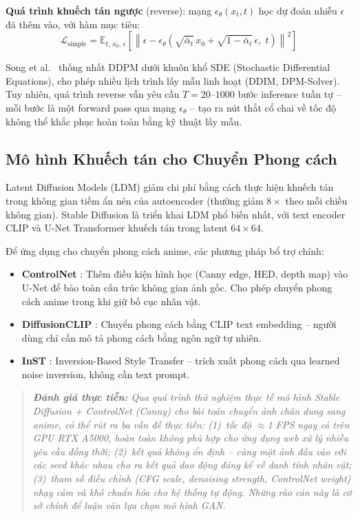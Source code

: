 \textbf{Quá trình khuếch tán ngược} (reverse): mạng $\epsilon_\theta(x_t, t)$ học dự đoán nhiễu $\epsilon$ đã thêm vào, với hàm mục tiêu:
\begin{equation}
\label{eq:diffusion_loss}
\mathcal{L}_{\text{simple}} = \mathbb{E}_{t,\, x_0,\, \epsilon}\!\left[\left\| \epsilon - \epsilon_\theta\!\left(\sqrt{\bar{\alpha}_t}\,x_0 + \sqrt{1-\bar{\alpha}_t}\,\epsilon,\; t\right) \right\|^2\right]
\end{equation}

Song et al.~\cite{Song2021} thống nhất DDPM dưới khuôn khổ SDE (Stochastic Differential Equations), cho phép nhiều lịch trình lấy mẫu linh hoạt (DDIM, DPM-Solver). Tuy nhiên, quá trình reverse vẫn yêu cầu $T = 20$--$1000$ bước inference tuần tự -- mỗi bước là một forward pass qua mạng $\epsilon_\theta$ -- tạo ra nút thắt cổ chai về tốc độ không thể khắc phục hoàn toàn bằng kỹ thuật lấy mẫu.

\subsection{Mô hình Khuếch tán cho Chuyển Phong cách}
\label{subsec:diffusion_style_transfer}

Latent Diffusion Models (LDM) \cite{Rombach2022} giảm chi phí bằng cách thực hiện khuếch tán trong không gian tiềm ẩn nén của autoencoder (thường giảm $8\times$ theo mỗi chiều không gian). Stable Diffusion là triển khai LDM phổ biến nhất, với text encoder CLIP và U-Net Transformer khuếch tán trong latent $64 \times 64$.

Để ứng dụng cho chuyển phong cách anime, các phương pháp bổ trợ chính:
\begin{itemize}
    \item \textbf{ControlNet} \cite{Zhang2023ControlNet}: Thêm điều kiện hình học (Canny edge, HED, depth map) vào U-Net để bảo toàn cấu trúc không gian ảnh gốc. Cho phép chuyển phong cách anime trong khi giữ bố cục nhân vật.
    \item \textbf{DiffusionCLIP} \cite{Kim2022DiffusionCLIP}: Chuyển phong cách bằng CLIP text embedding -- người dùng chỉ cần mô tả phong cách bằng ngôn ngữ tự nhiên.
    \item \textbf{InST} \cite{Zhang2023InST}: Inversion-Based Style Transfer -- trích xuất phong cách qua learned noise inversion, không cần text prompt.
\end{itemize}

\begin{quote}
\textit{\textbf{Đánh giá thực tiễn:} Qua quá trình thử nghiệm thực tế mô hình Stable Diffusion + ControlNet (Canny) cho bài toán chuyển ảnh chân dung sang anime, có thể rút ra ba vấn đề thực tiễn: (1)~tốc độ $\approx$1 FPS ngay cả trên GPU RTX A5000, hoàn toàn không phù hợp cho ứng dụng web xử lý nhiều yêu cầu đồng thời; (2)~kết quả không ổn định -- cùng một ảnh đầu vào với các seed khác nhau cho ra kết quả dao động đáng kể về danh tính nhân vật; (3)~tham số điều chỉnh (CFG scale, denoising strength, ControlNet weight) nhạy cảm và khó chuẩn hóa cho hệ thống tự động. Những rào cản này là cơ sở chính để luận văn lựa chọn mô hình GAN.}
\end{quote}

